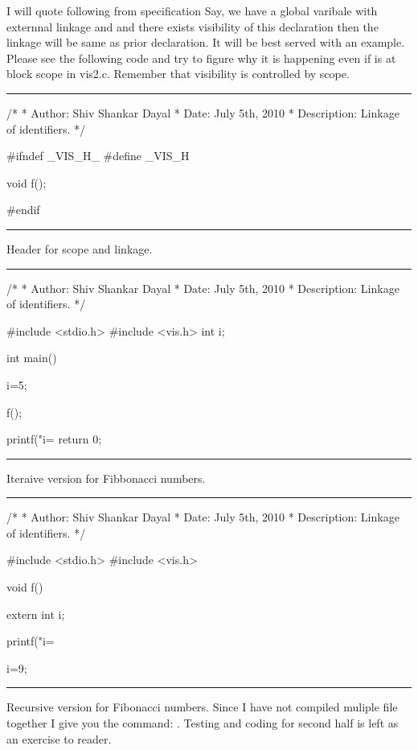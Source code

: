 I will quote following from specification 
Say, we have a global varibale with externnal linkage and and there
exists visibility of this declaration then the linkage will be same as
prior declaration. It will be best served with an example. Please see
the following code and try to figure why it is happening even if
 is at block scope in vis2.c. Remember that
visibility is controlled by scope.
\blank[force,1mm]\hrule\blank[force,1mm]
\startCPP
/*
 * Author: Shiv Shankar Dayal
 * Date: July 5th, 2010
 * Description: Linkage of identifiers.
 */

#ifndef _VIS_H_
#define _VIS_H

void f();

#endif
\stopCPP
{}
\hrule
\blank[force,1mm]
\startalignment[middle]
Header for scope and linkage.
\stopalignment
\blank[force,1mm]\hrule\blank[force,1mm]
\startCPP
/*
 * Author: Shiv Shankar Dayal
 * Date: July 5th, 2010
 * Description: Linkage of identifiers.
 */

#include <stdio.h>
#include <vis.h>
int i;

int main()
{
  i=5;

  f();

  printf("i=%
  return 0;
}		
\stopCPP
{}
\hrule
\blank[force,1mm]
\startalignment[middle]
Iteraive version for Fibbonacci numbers.
\stopalignment
\blank[force,1mm]\hrule\blank[force,1mm]
\startCPP
/*
 * Author: Shiv Shankar Dayal
 * Date: July 5th, 2010
 * Description: Linkage of identifiers.
 */

#include <stdio.h>
#include <vis.h>

void f()
{
	extern int i;

	printf("i=%
	
	i=9;
}	
\stopCPP
{}
\hrule
\blank[force,1mm]
\startalignment[middle]
Recursive version for Fibonacci numbers.
\stopalignment
Since I have not compiled muliple file together I give you the
command: . Testing
and coding for second half is left as an exercise to reader.

